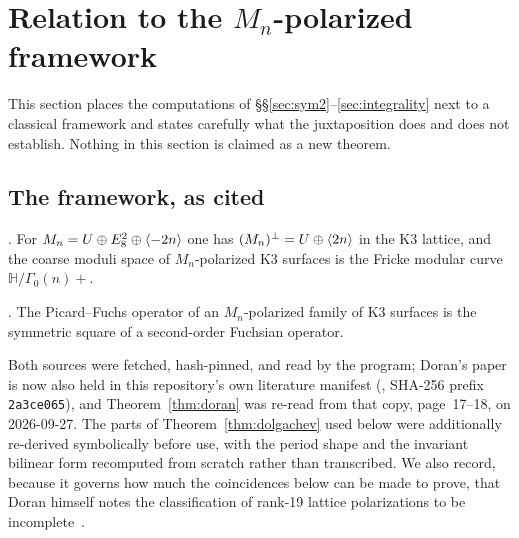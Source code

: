 \section{Relation to the \texorpdfstring{$M_n$}{Mn}-polarized framework}
\label{sec:framework}

This section places the computations of \S\S\ref{sec:sym2}--\ref{sec:integrality}
next to a classical framework and states carefully what the juxtaposition does
and does not establish. Nothing in this section is claimed as a new theorem.

\subsection{The framework, as cited}

\begin{theorem}\label{thm:dolgachev}
\cite[\S7, p.~20 and Thm.~7.1]{Dolgachev1996}. For $M_n = U\oplus E_8^2
\oplus\langle -2n\rangle$ one has $(M_n)^{\perp} = U\oplus\langle 2n\rangle$ in the K3 lattice,
and the coarse moduli space of $M_n$-polarized K3 surfaces is the Fricke
modular curve $\mathbb{H}/\Gamma_0(n)+$.
\end{theorem}

\begin{theorem}\label{thm:doran}
\cite[Thm.~5.13]{Doran2000}. The Picard--Fuchs operator of an
$M_n$-polarized family of K3 surfaces is the symmetric square of a
second-order Fuchsian operator.
\end{theorem}

Both sources were fetched, hash-pinned, and read by the program; Doran's paper
is now also held in this repository's own literature manifest
(, SHA-256 prefix \texttt{2a3ce065}),
and Theorem~\ref{thm:doran} was re-read from that copy, page~17--18, on
2026-09-27. The parts of Theorem~\ref{thm:dolgachev} used below were
additionally re-derived
symbolically before use, with the period shape and the invariant bilinear form
recomputed from scratch rather than transcribed. We also record, because it
governs how much the coincidences below can be made to prove, that Doran
himself notes the classification of rank-19 lattice polarizations to be
incomplete~\cite[\S6]{Doran2000}.

